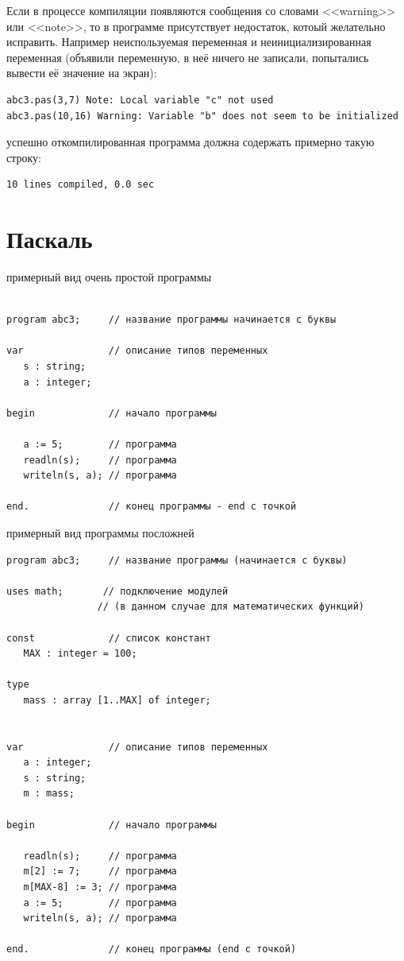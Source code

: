\documentclass[unicode, 12pt, a4paper,oneside,fleqn]{article}
\begin{document}
Если в процессе компиляции появляются сообщения со словами <<warning>>
или <<note>>, то в программе присутствует недостаток, котоый
желательно исправить. Например неиспользуемая переменная и
неинициализированная переменная (объявили переменную, в неё ничего не
записали, попытались вывести её значение на экран):

{\tiny
\begin{verbatim}
abc3.pas(3,7) Note: Local variable "c" not used
abc3.pas(10,16) Warning: Variable "b" does not seem to be initialized
\end{verbatim}
}

успешно откомпилированная программа должна содержать примерно такую
строку:
\begin{verbatim}
10 lines compiled, 0.0 sec
\end{verbatim}


\section{Паскаль}

примерный вид очень простой программы


\begin{lstlisting}

program abc3;     // название программы начинается с буквы

var               // описание типов переменных
   s : string;
   a : integer;

begin             // начало программы

   a := 5;        // программа
   readln(s);     // программа
   writeln(s, a); // программа
   
end.              // конец программы - end с точкой

\end{lstlisting}





примерный вид программы посложней


\begin{lstlisting}
program abc3;     // название программы (начинается с буквы)

uses math;       // подключение модулей
                // (в данном случае для математических функций)

const             // список констант
   MAX : integer = 100;  

type
   mass : array [1..MAX] of integer;


var               // описание типов переменных
   a : integer;
   s : string;
   m : mass;

begin             // начало программы

   readln(s);     // программа
   m[2] := 7;     // программа
   m[MAX-8] := 3; // программа
   a := 5;        // программа
   writeln(s, a); // программа
   
end.              // конец программы (end с точкой)
\end{lstlisting}
\end{document}
